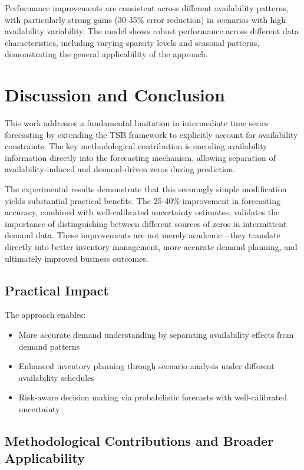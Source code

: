\documentclass[11pt]{amsart}
\theoremstyle{definition}
\begin{document}
Performance improvements are consistent across different availability patterns, with particularly strong gains (30-35\% 
error reduction) in scenarios with high availability variability. The model shows robust performance across different 
data characteristics, including varying sparsity levels and seasonal patterns, demonstrating the general applicability 
of the approach.

\section{Discussion and Conclusion}

This work addresses a fundamental limitation in intermediate time series forecasting by extending the TSB framework 
to explicitly account for availability constraints. The key methodological contribution is encoding availability 
information directly into the forecasting mechanism, allowing separation of availability-induced and demand-driven 
zeros during prediction.

The experimental results demonstrate that this seemingly simple modification yields substantial practical benefits. 
The 25-40\% improvement in forecasting accuracy, combined with well-calibrated uncertainty estimates, validates the 
importance of distinguishing between different sources of zeros in intermittent demand data. These improvements are 
not merely academic—they translate directly into better inventory management, more accurate demand planning, and 
ultimately improved business outcomes.

\subsection{Practical Impact}

The approach enables:
\begin{itemize}
    \item More accurate demand understanding by separating availability effects from demand patterns
    \item Enhanced inventory planning through scenario analysis under different availability schedules
    \item Risk-aware decision making via probabilistic forecasts with well-calibrated uncertainty
\end{itemize}

\subsection{Methodological Contributions and Broader Applicability}
\end{document}
